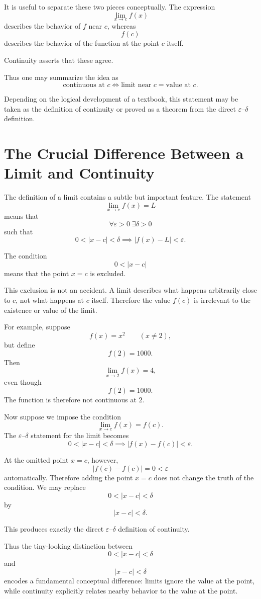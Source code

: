 \documentclass{essay}
\begin{document}
It is useful to separate these two pieces conceptually. The expression
\[ \lim_{x\to c} f(x) \]
describes the behavior of \(f\) near \(c\), whereas
\[ f(c) \]
describes the behavior of the function at the point \(c\) itself.

Continuity asserts that these agree.

Thus one may summarize the idea as
\[ \boxed{ \text{continuous at }c \iff \text{limit near }c = \text{value at }c. } \]

Depending on the logical development of a textbook, this statement may be taken as the definition of continuity or proved as a theorem from the direct \(\varepsilon\)--\(\delta\) definition.

\section{The Crucial Difference Between a Limit and Continuity}

The definition of a limit contains a subtle but important feature. The statement
\[ \lim_{x\to c} f(x)=L \]
means that
\[ \forall \varepsilon>0\;\exists\delta>0 \]
such that
\[ 0<|x-c|<\delta \implies |f(x)-L|<\varepsilon. \]

The condition
\[ 0<|x-c| \]
means that the point \(x=c\) is excluded.

This exclusion is not an accident. A limit describes what happens arbitrarily close to \(c\), not what happens at \(c\) itself. Therefore the value \(f(c)\) is irrelevant to the existence or value of the limit.

For example, suppose
\[ f(x)=x^{2} \qquad (x\neq 2), \]
but define
\[ f(2)=1000. \]
Then
\[ \lim_{x\to 2} f(x)=4, \]
even though
\[ f(2)=1000. \]
The function is therefore not continuous at \(2\).

Now suppose we impose the condition
\[ \lim_{x\to c}f(x)=f(c). \]
The \(\varepsilon\)--\(\delta\) statement for the limit becomes
\[ 0<|x-c|<\delta \implies |f(x)-f(c)|<\varepsilon. \]

At the omitted point \(x=c\), however,
\[ |f(c)-f(c)|=0<\varepsilon \]
automatically. Therefore adding the point \(x=c\) does not change the truth of the condition. We may replace
\[ 0<|x-c|<\delta \]
by
\[ |x-c|<\delta. \]

This produces exactly the direct \(\varepsilon\)--\(\delta\) definition of continuity.

Thus the tiny-looking distinction between
\[ 0<|x-c|<\delta \]
and
\[ |x-c|<\delta \]
encodes a fundamental conceptual difference: limits ignore the value at the point, while continuity explicitly relates nearby behavior to the value at the point.
\end{document}
